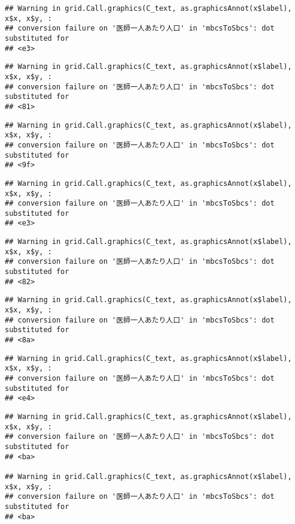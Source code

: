\documentclass[
]{article}
\begin{document}
\begin{verbatim}
## Warning in grid.Call.graphics(C_text, as.graphicsAnnot(x$label), x$x, x$y, :
## conversion failure on '医師一人あたり人口' in 'mbcsToSbcs': dot substituted for
## <e3>
\end{verbatim}

\begin{verbatim}
## Warning in grid.Call.graphics(C_text, as.graphicsAnnot(x$label), x$x, x$y, :
## conversion failure on '医師一人あたり人口' in 'mbcsToSbcs': dot substituted for
## <81>
\end{verbatim}

\begin{verbatim}
## Warning in grid.Call.graphics(C_text, as.graphicsAnnot(x$label), x$x, x$y, :
## conversion failure on '医師一人あたり人口' in 'mbcsToSbcs': dot substituted for
## <9f>
\end{verbatim}

\begin{verbatim}
## Warning in grid.Call.graphics(C_text, as.graphicsAnnot(x$label), x$x, x$y, :
## conversion failure on '医師一人あたり人口' in 'mbcsToSbcs': dot substituted for
## <e3>
\end{verbatim}

\begin{verbatim}
## Warning in grid.Call.graphics(C_text, as.graphicsAnnot(x$label), x$x, x$y, :
## conversion failure on '医師一人あたり人口' in 'mbcsToSbcs': dot substituted for
## <82>
\end{verbatim}

\begin{verbatim}
## Warning in grid.Call.graphics(C_text, as.graphicsAnnot(x$label), x$x, x$y, :
## conversion failure on '医師一人あたり人口' in 'mbcsToSbcs': dot substituted for
## <8a>
\end{verbatim}

\begin{verbatim}
## Warning in grid.Call.graphics(C_text, as.graphicsAnnot(x$label), x$x, x$y, :
## conversion failure on '医師一人あたり人口' in 'mbcsToSbcs': dot substituted for
## <e4>
\end{verbatim}

\begin{verbatim}
## Warning in grid.Call.graphics(C_text, as.graphicsAnnot(x$label), x$x, x$y, :
## conversion failure on '医師一人あたり人口' in 'mbcsToSbcs': dot substituted for
## <ba>

## Warning in grid.Call.graphics(C_text, as.graphicsAnnot(x$label), x$x, x$y, :
## conversion failure on '医師一人あたり人口' in 'mbcsToSbcs': dot substituted for
## <ba>
\end{verbatim}
\end{document}
